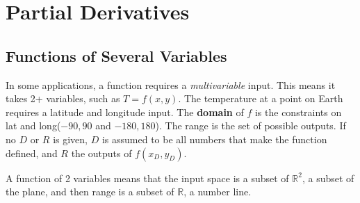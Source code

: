 \documentclass{article}
\begin{document}
\section{Partial Derivatives}
\subsection{Functions of Several Variables}
In some applications, a function requires a \textit{multivariable} input. This means it takes 2+ variables, such as $T = f(x,y)$. The temperature at a point on Earth requires a latitude and longitude input. The \textbf{domain} of $f$ is the constraints on lat and long($-90,90$ and $-180,180$). The range is the set of possible outputs. If no $D$ or $R$ is given, $D$ is assumed to be all numbers that make the function defined, and $R$ the outputs of $f(x_D,y_D)$.

A function of 2 variables means that the input space is a subset of $\mathbb{R}^2$, a subset of the plane, and then range is a subset of $\mathbb{R}$, a number line.
\end{document}
